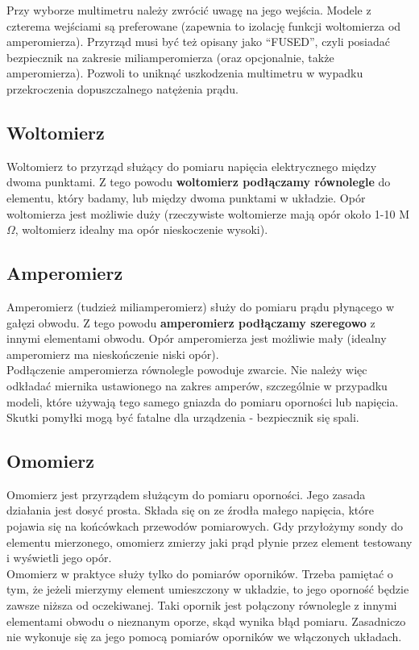 Przy wyborze multimetru należy zwrócić uwagę na jego wejścia. Modele z czterema wejściami są preferowane (zapewnia to izolację funkcji woltomierza
od amperomierza). Przyrząd musi być też opisany jako ``FUSED'', czyli posiadać bezpiecznik na zakresie miliamperomierza (oraz opcjonalnie,
także amperomierza). Pozwoli to uniknąć uszkodzenia multimetru w wypadku przekroczenia dopuszczalnego natężenia prądu.

\subsection{Woltomierz}
Woltomierz to przyrząd służący do pomiaru napięcia elektrycznego między dwoma punktami. Z tego powodu
\textbf{woltomierz podłączamy równolegle} do elementu, który badamy, lub między dwoma punktami w układzie. Opór woltomierza jest możliwie duży (rzeczywiste
woltomierze mają opór około 1-10 M$\Omega$, woltomierz idealny ma opór nieskoczenie wysoki).

\subsection{Amperomierz}
Amperomierz (tudzież miliamperomierz) służy do pomiaru prądu płynącego w gałęzi obwodu. Z tego powodu
\textbf{amperomierz podłączamy szeregowo} z innymi elementami obwodu. Opór amperomierza jest możliwie mały (idealny amperomierz
ma nieskończenie niski opór).
\\

Podłączenie amperomierza równolegle powoduje zwarcie. Nie należy więc odkładać miernika ustawionego na zakres amperów, szczególnie
w przypadku modeli, które używają tego samego gniazda do pomiaru oporności lub napięcia. Skutki pomyłki mogą być fatalne dla
urządzenia - bezpiecznik się spali.

\subsection{Omomierz}
Omomierz jest przyrządem służącym do pomiaru oporności. Jego zasada działania jest dosyć prosta. Składa się on ze źrodła małego napięcia, które pojawia się na końcówkach przewodów pomiarowych. Gdy przyłożymy sondy do elementu mierzonego, omomierz zmierzy jaki prąd płynie przez element testowany i wyświetli jego opór.
\\

Omomierz w praktyce służy tylko do pomiarów oporników. Trzeba pamiętać o tym, że jeżeli mierzymy element umieszczony w układzie,
to jego oporność będzie zawsze niższa od oczekiwanej. Taki opornik jest połączony równolegle z innymi elementami obwodu o
nieznanym oporze, skąd wynika błąd pomiaru.
Zasadniczo nie wykonuje się za jego pomocą pomiarów oporników we włączonych układach.
\\

